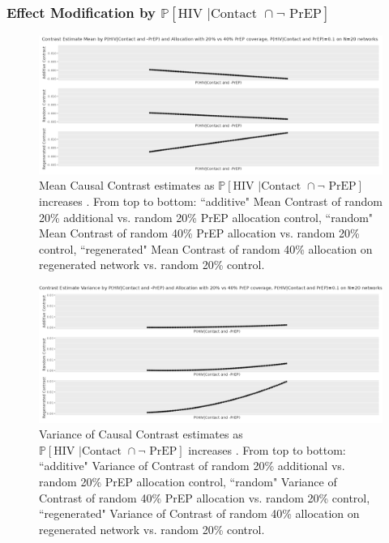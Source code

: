 \documentclass{article}
\theoremstyle{definition}
\begin{document}
\subsubsection{Effect Modification by \texorpdfstring{$\mathbb{P}[\text{HIV } | \text {Contact } \cap \neg \text{ PrEP}]$}{ℙ[HIV | ¬PrEP]}}
\begin{figure}[H]
    \centering
    \includegraphics[width=\linewidth]{Corrected Figures/p1 Mean plots.png}
    \caption{Mean Causal Contrast estimates as $\mathbb{P}\left[\text{HIV } \vert \text {Contact } \cap \neg \text{ PrEP}\right]$ increases . From top to bottom: ``additive" Mean Contrast of random 20\% additional vs. random 20\% PrEP allocation control, ``random" Mean Contrast of random 40\% PrEP allocation vs. random 20\% control, ``regenerated" Mean Contrast of random 40\% allocation on regenerated network vs. random 20\% control.}
    \label{fig:Figure S4.7}
\end{figure}
\begin{figure}[H]
    \centering
    \includegraphics[width=\linewidth]{Corrected Figures/p1 Variance plots.png}
    \caption{Variance of Causal Contrast estimates as $\mathbb{P}\left[\text{HIV } \vert \text {Contact } \cap \neg \text{ PrEP}\right]$ increases .  From top to bottom: ``additive" Variance of Contrast of random 20\% additional vs. random 20\% PrEP allocation control, ``random" Variance of Contrast of random 40\% PrEP allocation vs. random 20\% control, ``regenerated" Variance of Contrast of random 40\% allocation on regenerated network vs. random 20\% control.}
    \label{fig:Figure S4.8}
\end{figure}
\end{document}
